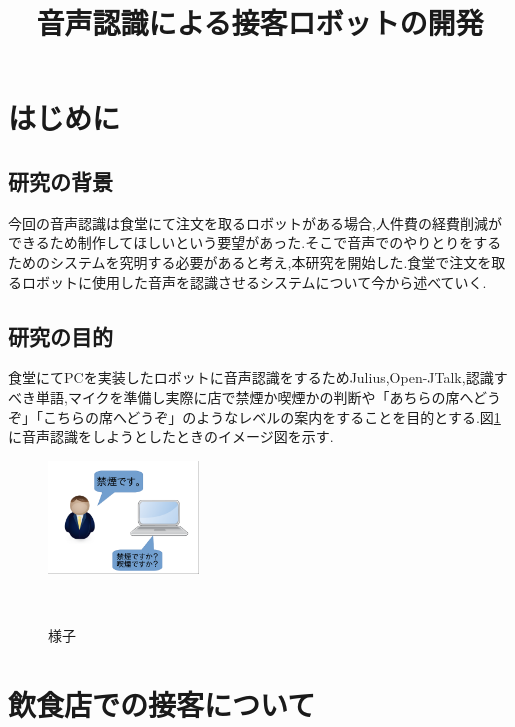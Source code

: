 \documentclass[a4paper]{jarticle}
\begin{document}
\title{音声認識による接客ロボットの開発}




\maketitle
\section{はじめに}
\subsection{研究の背景}
今回の音声認識は食堂にて注文を取るロボットがある場合,人件費の経費削減ができるため制作してほしいという要望があった.そこで音声でのやりとりをするためのシステムを究明する必要があると考え,本研究を開始した.食堂で注文を取るロボットに使用した音声を認識させるシステムについて今から述べていく.


\subsection{研究の目的}
食堂にてPCを実装したロボットに音声認識をするためJulius,Open-JTalk,認識すべき単語,マイクを準備し実際に店で禁煙か喫煙かの判断や「あちらの席へどうぞ」「こちらの席へどうぞ」のようなレベルの案内をすることを目的とする.図\ref{fig:yousu}に音声認識をしようとしたときのイメージ図を示す.


\begin{figure}[htbp]
 \begin{center}
  \includegraphics[width=40mm]{img/sukusho.png}
 　\caption{様子}
 　\label{fig:yousu}
 \end{center}
\end{figure}


\section{飲食店での接客について}
\end{document}
